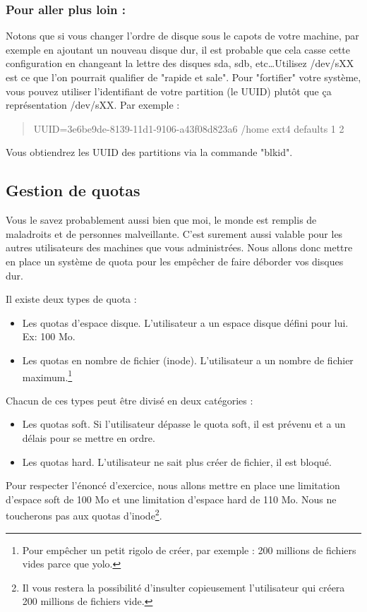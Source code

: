 \documentclass[a4paper,11pt]{article}
\newcommand{\commande}[1] {
    \begin{quote}
    \tt\raggedright #1 
    \end{quote}
}
\begin{document}
\subsubsection*{Pour aller plus loin :}
\par Notons que si vous changer l'ordre de disque sous le capots de votre machine, par exemple en ajoutant un nouveau disque dur, il est probable que cela casse cette configuration en changeant la lettre des disques sda, sdb, etc\dots Utilisez /dev/sXX est ce que l'on pourrait qualifier de "rapide et sale". Pour "fortifier" votre système, vous pouvez utiliser l'identifiant de votre partition (le UUID) plutôt que ça représentation /dev/sXX. Par exemple :
\commande{UUID=3e6be9de-8139-11d1-9106-a43f08d823a6 /home ext4 defaults 1 2}
\par Vous obtiendrez les UUID des partitions via la commande "blkid".

\subsection{Gestion de quotas}
\par Vous le savez probablement aussi bien que moi, le monde est remplis de maladroits et de personnes malveillante. C'est surement aussi valable pour les autres utilisateurs des machines que vous administrées. Nous allons donc mettre en place un système de quota pour les empêcher de faire déborder vos disques dur.
\par Il existe deux types de quota :
\begin{itemize}
\item Les quotas d'espace disque. L'utilisateur a un espace disque défini pour lui. Ex: 100 Mo.
\item Les quotas en nombre de fichier (inode). L'utilisateur a un nombre de fichier maximum.\footnote{Pour empêcher un petit rigolo de créer, par exemple : 200 millions de fichiers vides parce que yolo.}
\end{itemize}
\par Chacun de ces types peut être divisé en deux catégories :
\begin{itemize}
\item Les quotas soft. Si l'utilisateur dépasse le quota soft, il est prévenu et a un délais pour se mettre en ordre.
\item Les quotas hard. L'utilisateur ne sait plus créer de fichier, il est bloqué.
\end{itemize}
\par Pour respecter l'énoncé d'exercice, nous allons mettre en place une limitation d'espace soft de 100 Mo et une limitation d'espace hard de 110 Mo. Nous ne toucherons pas aux quotas d'inode\footnote{Il vous restera la possibilité d'insulter copieusement l'utilisateur qui créera 200 millions de fichiers vide.}.
\end{document}
